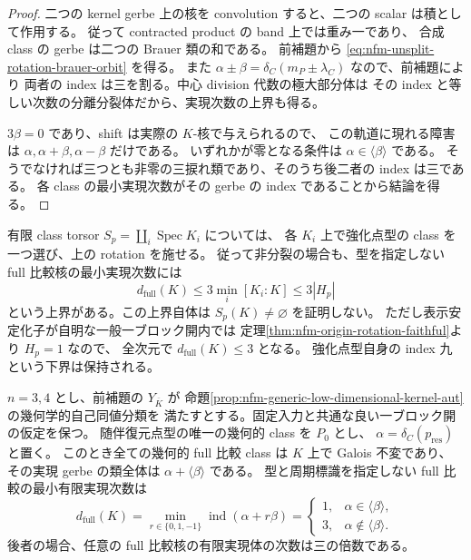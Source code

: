 \begin{proof}
二つの kernel gerbe 上の核を convolution すると、二つの scalar は積として作用する。
従って contracted product の band 上では重み一であり、
合成 class の gerbe は二つの Brauer 類の和である。
前補題から \eqref{eq:nfm-unsplit-rotation-brauer-orbit} を得る。
また $\alpha\pm\beta=\delta_C(m_P\pm\lambda_C)$ なので、前補題により
両者の index は三を割る。中心 division 代数の極大部分体は
その index と等しい次数の分離分裂体だから、実現次数の上界も得る。

$3\beta=0$ であり、shift は実際の $K$-核で与えられるので、
この軌道に現れる障害は $\alpha,\alpha+\beta,\alpha-\beta$ だけである。
いずれかが零となる条件は $\alpha\in\langle\beta\rangle$ である。
そうでなければ三つとも非零の三捩れ類であり、そのうち後二者の index は三である。
各 class の最小実現次数がその gerbe の index であることから結論を得る。
\end{proof}

有限 class torsor $S_p=\coprod_i\operatorname{Spec}K_i$ については、
各 $K_i$ 上で強化点型の class を一つ選び、上の rotation を施せる。
従って非分裂の場合も、型を指定しない full 比較核の最小実現次数には
\begin{equation}\label{eq:nfm-unsplit-full-finite-class-bound}
 d_{\mathrm{full}}(K)\le3\min_i[K_i:K]\le3|H_p|
\end{equation}
という上界がある。この上界自体は $S_p(K)\ne\varnothing$ を証明しない。
ただし表示安定化子が自明な一般一ブロック開内では
定理\ref{thm:nfm-origin-rotation-faithful}より $H_p=1$ なので、
全次元で $d_{\mathrm{full}}(K)\le3$ となる。
強化点型自身の index 九という下界は保持される。

\begin{theorem}
\label{thm:nfm-unsplit-lowdim-full-degree}
$n=3,4$ とし、前補題の $Y_{\overline K}$ が
命題\ref{prop:nfm-generic-low-dimensional-kernel-aut}の幾何学的自己同値分類を
満たすとする。固定入力と共通な良い一ブロック開の仮定を保つ。
随伴復元点型の唯一の幾何的 class を $P_0$ とし、
$\alpha=\delta_C(p_{\mathrm{res}})$ と置く。
このとき全ての幾何的 full 比較 class は $K$ 上で Galois 不変であり、
その実現 gerbe の類全体は $\alpha+\langle\beta\rangle$ である。
型と周期標識を指定しない full 比較の最小有限実現次数は
\begin{equation}\label{eq:nfm-unsplit-lowdim-full-minimum}
 d_{\mathrm{full}}(K)
 =\min_{r\in\{0,1,-1\}}\operatorname{ind}(\alpha+r\beta)
 =\begin{cases}
  1,&\alpha\in\langle\beta\rangle,\\
  3,&\alpha\notin\langle\beta\rangle.
 \end{cases}
\end{equation}
後者の場合、任意の full 比較核の有限実現体の次数は三の倍数である。
\end{theorem}

